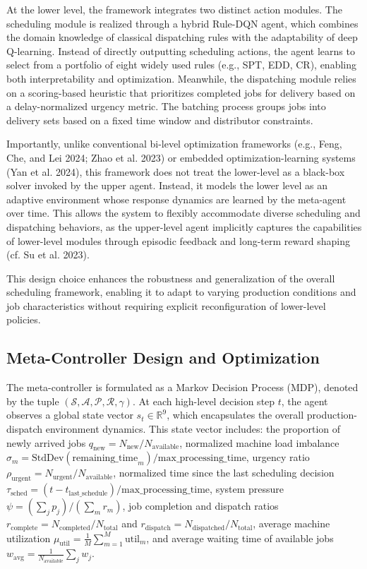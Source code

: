 \documentclass{article}
\begin{document}
At the lower level, the framework integrates two distinct action modules. The scheduling module is realized through a hybrid Rule-DQN agent, which combines the domain knowledge of classical dispatching rules with the adaptability of deep Q-learning. Instead of directly outputting scheduling actions, the agent learns to select from a portfolio of eight widely used rules (e.g., SPT, EDD, CR), enabling both interpretability and optimization. Meanwhile, the dispatching module relies on a scoring-based heuristic that prioritizes completed jobs for delivery based on a delay-normalized urgency metric. The batching process groups jobs into delivery sets based on a fixed time window and distributor constraints.

Importantly, unlike conventional bi-level optimization frameworks (e.g., Feng, Che, and Lei 2024; Zhao et al. 2023) or embedded optimization-learning systems (Yan et al. 2024), this framework does not treat the lower-level as a black-box solver invoked by the upper agent. Instead, it models the lower level as an adaptive environment whose response dynamics are learned by the meta-agent over time. This allows the system to flexibly accommodate diverse scheduling and dispatching behaviors, as the upper-level agent implicitly captures the capabilities of lower-level modules through episodic feedback and long-term reward shaping (cf. Su et al. 2023). 

This design choice enhances the robustness and generalization of the overall scheduling framework, enabling it to adapt to varying production conditions and job characteristics without requiring explicit reconfiguration of lower-level policies.
\subsection{Meta-Controller Design and Optimization}

The meta-controller is formulated as a Markov Decision Process (MDP), denoted by the tuple $(\mathcal{S}, \mathcal{A}, \mathcal{P}, \mathcal{R}, \gamma)$. At each high-level decision step $t$, the agent observes a global state vector $s_t \in \mathbb{R}^9$, which encapsulates the overall production-dispatch environment dynamics. This state vector includes: the proportion of newly arrived jobs $q_{\text{new}} = N_{\text{new}} / N_{\text{available}}$, normalized machine load imbalance $\sigma_m = \text{StdDev}(\text{remaining\_time}_m)/\text{max\_processing\_time}$, urgency ratio $\rho_{\text{urgent}} = N_{\text{urgent}} / N_{\text{available}}$, normalized time since the last scheduling decision $\tau_{\text{sched}} = (t - t_{\text{last\_schedule}})/\text{max\_processing\_time}$, system pressure $\psi = (\sum_j p_j)/(\sum_m r_m)$, job completion and dispatch ratios $r_{\text{complete}} = N_{\text{completed}} / N_{\text{total}}$ and $r_{\text{dispatch}} = N_{\text{dispatched}} / N_{\text{total}}$, average machine utilization $\mu_{\text{util}} = \frac{1}{M} \sum_{m=1}^{M} \text{util}_m$, and average waiting time of available jobs $w_{\text{avg}} = \frac{1}{N_{\text{available}}} \sum_{j} w_j$.
\end{document}
